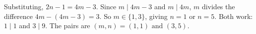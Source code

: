 Substituting, $2n-1=4m-3$. Since $m\mid4m-3$ and $m\mid4m$, $m$ divides the difference $4m-(4m-3)=3$. So $m\in\{1,3\}$, giving $n=1$ or $n=5$. Both work: $1\mid1$ and $3\mid9$. The pairs are $\boxed{(m,n)=(1,1)\text{ and }(3,5)}$.
